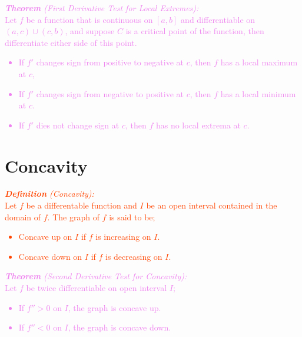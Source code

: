 \documentclass{report}
\newenvironment{definition}[1][OrangeRed]
  {\begin{tcolorbox}[colframe=#1,colback=white]}
  {\end{tcolorbox}}
\newenvironment{theorem}[1][Violet]
  {\begin{tcolorbox}[colframe=#1,colback=white]}
  {\end{tcolorbox}}
\begin{document}
\begin{theorem}
    \textcolor{Violet}{\textit{\textbf{Theorem} (First Derivative Test for Local Extremes):}\\
    Let $f$ be a function that is continuous on $[a,b]$ and differentiable on $(a,c) \cup (c,b)$, and suppose $C$ is a critical point of the function, then differentiate either side of this point.
    \begin{itemize}
        \item If $f'$ changes sign from positive to negative at $c$, then $f$ has a local maximum at $c$,
        \item If $f'$ changes sign from negative to positive at $c$, then $f$ has a local minimum at $c$.
        \item If $f'$ dies not change sign at $c$, then $f$ has no local extrema at $c$.
    \end{itemize}}
\end{theorem}

\section{Concavity}

\begin{definition}
    \textcolor{OrangeRed}{\textit{\textbf{Definition} (Concavity):}\\
    Let $f$ be a differentable function and $I$ be an open interval contained in the domain of $f$. The graph of $f$ is said to be;
    \begin{itemize}
        \item Concave up on $I$ if $f$ is increasing on $I$.
        \item Concave down on $I$ if $f$ is decreasing on $I$.
    \end{itemize}}
\end{definition}

\begin{theorem}
    \textcolor{Violet}{\textit{\textbf{Theorem} (Second Derivative Test for Concavity):}\\
    Let $f$ be twice differentiable on open interval $I$;
    \begin{itemize}
        \item If $f'' > 0$ on $I$, the graph is concave up.
        \item If $f'' < 0$ on $I$, the graph is concave down.
    \end{itemize}}
\end{theorem}
\end{document}
